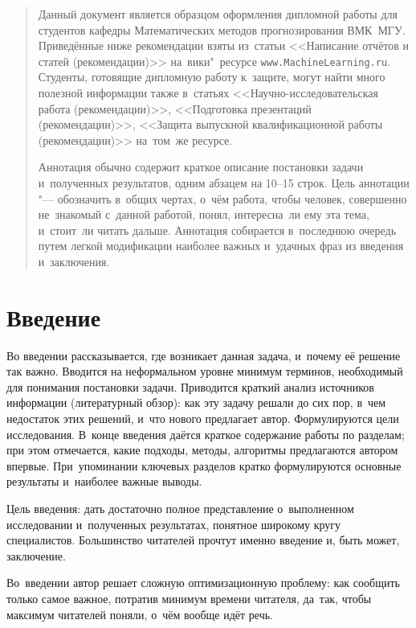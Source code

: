 \documentclass[12pt]{article}
\begin{document}
\newpage
\renewcommand{\contentsname}{Содержание}
\tableofcontents

\newpage
\begin{abstract}
    Данный документ является образцом оформления дипломной работы для
    студентов кафедры Математических методов прогнозирования ВМК~МГУ.
    Приведённые ниже рекомендации взяты из~статьи <<Написание отчётов
    и статей (рекомендации)>> на~вики"~ресурсе
    \texttt{www.MachineLearning.ru}.  Студенты, готовящие дипломную
    работу к~защите, могут найти много полезной информации также
    в~статьях <<Научно-исследовательская работа (рекомендации)>>,
    <<Подготовка презентаций (рекомендации)>>, <<Защита выпускной
    квалификационной работы (рекомендации)>> на~том~же ресурсе.

    Аннотация обычно содержит краткое описание постановки задачи
    и~полученных результатов, одним абзацем на 10--15 строк.  Цель
    аннотации "--- обозначить в~общих чертах, о~чём работа, чтобы
    человек, совершенно не~знакомый с~данной работой, понял,
    интересна~ли ему эта тема, и~стоит~ли читать дальше.  Аннотация
    собирается в~последнюю очередь путем легкой модификации наиболее
    важных и~удачных фраз из введения и~заключения.
\end{abstract}

\newpage
\section{Введение}

Во введении рассказывается, где возникает данная задача, и~почему её
решение так важно.  Вводится на неформальном уровне минимум терминов,
необходимый для понимания постановки задачи.  Приводится краткий
анализ источников информации (литературный обзор): как эту задачу
решали до сих пор, в~чем недостаток этих решений, и~что нового
предлагает автор.  Формулируются цели исследования.  В~конце введения
даётся краткое содержание работы по разделам; при этом отмечается,
какие подходы, методы, алгоритмы предлагаются автором впервые.
При~упоминании ключевых разделов кратко формулируются основные
результаты и~наиболее важные выводы.

Цель введения: дать достаточно полное представление о~выполненном
исследовании и~полученных результатах, понятное широкому кругу
специалистов.  Большинство читателей прочтут именно введение и, быть
может, заключение.

Во~введении автор решает сложную оптимизационную проблему: как
сообщить только самое важное, потратив минимум времени читателя,
да~так, чтобы максимум читателей поняли, о~чём вообще идёт речь.
\end{document}
